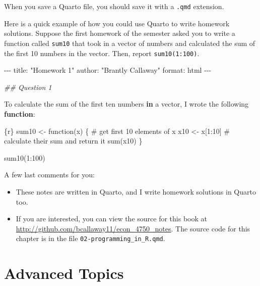 \documentclass[
  letterpaper,
  DIV=11,
  numbers=noendperiod]{scrreprt}
\newenvironment{Shaded}{\begin{snugshade}}{\end{snugshade}}
\newcommand{\AttributeTok}[1]{\textcolor[rgb]{0.40,0.45,0.13}{#1}}
\newcommand{\ControlFlowTok}[1]{\textcolor[rgb]{0.00,0.23,0.31}{\textbf{#1}}}
\newcommand{\DocumentationTok}[1]{\textcolor[rgb]{0.37,0.37,0.37}{\textit{#1}}}
\newcommand{\NormalTok}[1]{\textcolor[rgb]{0.00,0.23,0.31}{#1}}
\newcommand{\SpecialCharTok}[1]{\textcolor[rgb]{0.37,0.37,0.37}{#1}}
\newcommand{\StringTok}[1]{\textcolor[rgb]{0.13,0.47,0.30}{#1}}
\begin{document}
When you save a Quarto file, you should save it with a \texttt{.qmd}
extension.

Here is a quick example of how you could use Quarto to write homework
solutions. Suppose the first homework of the semester asked you to write
a function called \texttt{sum10} that took in a vector of numbers and
calculated the sum of the first 10 numbers in the vector. Then, report
\texttt{sum10(1:100)}.

\begin{Shaded}
\begin{Highlighting}[]
\SpecialCharTok{{-}{-}{-}}
\NormalTok{title}\SpecialCharTok{:} \StringTok{"Homework 1"}
\NormalTok{author}\SpecialCharTok{:} \StringTok{"Brantly Callaway"}
\NormalTok{format}\SpecialCharTok{:}\NormalTok{ html}
\SpecialCharTok{{-}{-}{-}}

\DocumentationTok{\#\# Question 1}

\NormalTok{To calculate the sum of the first ten numbers }\ControlFlowTok{in}\NormalTok{ a vector, }
\NormalTok{I wrote the following }\ControlFlowTok{function}\SpecialCharTok{:}

\StringTok{\textasciigrave{}\textasciigrave{}\textasciigrave{}}\AttributeTok{\{r\}}
\AttributeTok{sum10 \textless{}{-} function(x) \{}
\AttributeTok{  \# get first 10 elements of x}
\AttributeTok{  x10 \textless{}{-} x[1:10] }
\AttributeTok{  \# calculate their sum and return it}
\AttributeTok{  sum(x10) }
\AttributeTok{\}}

\AttributeTok{sum10(1:100)}
\StringTok{\textasciigrave{}\textasciigrave{}\textasciigrave{}}
\end{Highlighting}
\end{Shaded}

A few last comments for you:

\begin{itemize}
\item
  These notes are written in Quarto, and I write homework solutions in
  Quarto too.
\item
  If you are interested, you can view the source for this book at
  \url{http://github.com/bcallaway11/econ_4750_notes}. The source code
  for this chapter is in the file \texttt{02-programming\_in\_R.qmd}.
\end{itemize}

\section{Advanced Topics}\label{advanced-topics}
\end{document}
